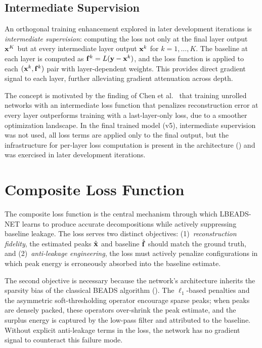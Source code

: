 \subsection{Intermediate Supervision}
\label{sec:method_intermediate}

An orthogonal training enhancement explored in later development iterations is \emph{intermediate supervision}: computing the loss not only at the final layer output $\mathbf{x}^K$ but at every intermediate layer output $\mathbf{x}^k$ for $k = 1, \ldots, K$. The baseline at each layer is computed as $\mathbf{f}^k = L(\mathbf{y} - \mathbf{x}^k)$, and the loss function is applied to each $(\mathbf{x}^k, \mathbf{f}^k)$ pair with layer-dependent weights. This provides direct gradient signal to each layer, further alleviating gradient attenuation across depth.

The concept is motivated by the finding of Chen et al.~\cite{chen2025demun} that training unrolled networks with an intermediate loss function that penalizes reconstruction error at every layer outperforms training with a last-layer-only loss, due to a smoother optimization landscape. In the final trained model (v5), intermediate supervision was not used, all loss terms are applied only to the final output, but the infrastructure for per-layer loss computation is present in the architecture () and was exercised in later development iterations.


\section{Composite Loss Function}
\label{sec:method_loss}

The composite loss function is the central mechanism through which LBEADS-NET learns to produce accurate decompositions while actively suppressing baseline leakage. The loss serves two distinct objectives: (1)~\emph{reconstruction fidelity}, the estimated peaks $\hat{\mathbf{x}}$ and baseline $\hat{\mathbf{f}}$ should match the ground truth, and (2)~\emph{anti-leakage engineering}, the loss must actively penalize configurations in which peak energy is erroneously absorbed into the baseline estimate.

The second objective is necessary because the network's architecture inherits the sparsity bias of the classical BEADS algorithm (). The $\ell_1$-based penalties and the asymmetric soft-thresholding operator encourage sparse peaks; when peaks are densely packed, these operators over-shrink the peak estimate, and the surplus energy is captured by the low-pass filter and attributed to the baseline. Without explicit anti-leakage terms in the loss, the network has no gradient signal to counteract this failure mode.

